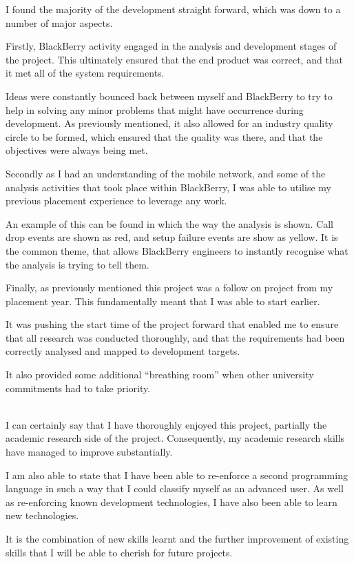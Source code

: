 I found the majority of the development straight forward, which was down to a 
number of major aspects. 

Firstly, BlackBerry activity engaged in the analysis and development stages of 
the project. This ultimately ensured that the end product was correct, and that
it met all of the system requirements.

Ideas were constantly bounced back between myself and BlackBerry to try to help
in solving any minor problems that might have occurrence during development. 
As previously mentioned, it also allowed for an industry quality circle to be 
formed, which ensured that the quality was there, and that the objectives were
always being met.

Secondly as I had an understanding of the mobile network, and some of the 
analysis activities that took place within BlackBerry, I was able to utilise 
my previous placement experience to leverage any work. 

An example of this can be found in which the way the analysis is shown. Call 
drop events are shown as red, and setup failure events are show as yellow. It 
is the common theme, that allows BlackBerry engineers to instantly recognise 
what the analysis is trying to tell them.

Finally, as previously mentioned this project was a follow on project from my 
placement year. This fundamentally meant that I was able to start earlier. 

It was pushing the start time of the project forward that enabled me to ensure 
that all research was conducted thoroughly, and that the requirements had been
correctly analysed and mapped to development targets.

It also provided some additional ``breathing room'' when other university 
commitments had to take priority.

~\\

I can certainly say that I have thoroughly enjoyed this project, partially the 
academic research side of the project. Consequently, my academic research 
skills have managed to improve substantially. 

I am also able to state that I have been able to re-enforce a second 
programming language in such a way that I could classify myself as an advanced 
user. As well as re-enforcing known development technologies, I have also been 
able to learn new technologies. 

It is the combination of new skills learnt and the further improvement of 
existing skills that I will be able to cherish for future projects.